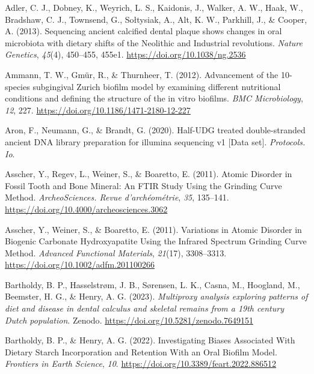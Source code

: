 \documentclass[
  b5paper,
]{book}
\newlength{\cslhangindent}
\newlength{\cslentryspacingunit} %
\newenvironment{CSLReferences}[2] %
 {%
  \setlength{\parindent}{0pt}
  \ifodd #1
  \let\oldpar\par
  \def\par{\hangindent=\cslhangindent\oldpar}
  \fi
  \setlength{\parskip}{#2\cslentryspacingunit}
 }%
 {}
\begin{document}
\hypertarget{refs-3}{}
\begin{CSLReferences}{1}{0}
\leavevmode{}%
Adler, C. J., Dobney, K., Weyrich, L. S., Kaidonis, J., Walker, A. W.,
Haak, W., Bradshaw, C. J., Townsend, G., Sołtysiak, A., Alt, K. W.,
Parkhill, J., \& Cooper, A. (2013). Sequencing ancient calcified dental
plaque shows changes in oral microbiota with dietary shifts of the
{Neolithic} and {Industrial} revolutions. \emph{Nature Genetics},
\emph{45}(4), 450--455, 455e1. \url{https://doi.org/10.1038/ng.2536}

\leavevmode{}%
Ammann, T. W., Gmür, R., \& Thurnheer, T. (2012). Advancement of the
10-species subgingival {Zurich} biofilm model by examining different
nutritional conditions and defining the structure of the in vitro
biofilms. \emph{BMC Microbiology}, \emph{12}, 227.
\url{https://doi.org/10.1186/1471-2180-12-227}

\leavevmode{}%
Aron, F., Neumann, G., \& Brandt, G. (2020). Half-{UDG} treated
double-stranded ancient {DNA} library preparation for illumina
sequencing v1 {[}{Data} set{]}. \emph{Protocols. Io}.

\leavevmode{}%
Asscher, Y., Regev, L., Weiner, S., \& Boaretto, E. (2011). Atomic
{Disorder} in {Fossil Tooth} and {Bone Mineral}: {An FTIR Study Using}
the {Grinding Curve Method}. \emph{ArcheoSciences. Revue
d'arch{é}om{é}trie}, \emph{35}, 135--141.
\url{https://doi.org/10.4000/archeosciences.3062}

\leavevmode{}%
Asscher, Y., Weiner, S., \& Boaretto, E. (2011). Variations in {Atomic
Disorder} in {Biogenic Carbonate Hydroxyapatite Using} the {Infrared
Spectrum Grinding Curve Method}. \emph{Advanced Functional Materials},
\emph{21}(17), 3308--3313. \url{https://doi.org/10.1002/adfm.201100266}

\leavevmode{}%
Bartholdy, B. P., Hasselstrøm, J. B., Sørensen, L. K., Casna, M.,
Hoogland, M., Beemster, H. G., \& Henry, A. G. (2023). \emph{Multiproxy
analysis exploring patterns of diet and disease in dental calculus and
skeletal remains from a 19th century {Dutch} population}. {Zenodo}.
\url{https://doi.org/10.5281/zenodo.7649151}

\leavevmode{}%
Bartholdy, B. P., \& Henry, A. G. (2022). Investigating {Biases
Associated With Dietary Starch Incorporation} and {Retention With} an
{Oral Biofilm Model}. \emph{Frontiers in Earth Science}, \emph{10}.
\url{https://doi.org/10.3389/feart.2022.886512}


\end{CSLReferences}
\end{document}
